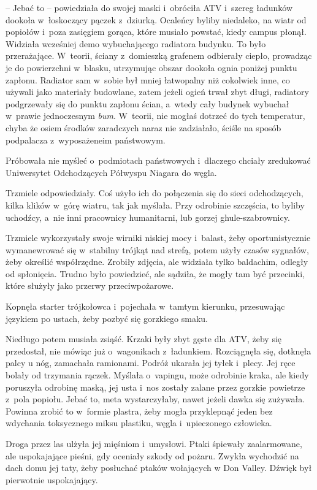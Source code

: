 \documentclass[oneside,polish,11pt,sfheadings]{mwbk}
\begin{document}
-- Jebać to -- powiedziała do swojej maski i~obróciła ATV i~szereg
ładunków dookoła w~łoskoczący pączek z~dziurką. Ocaleńcy byliby
niedaleko, na wiatr od popiołów i~poza zasięgiem gorąca, które musiało
powstać, kiedy campus płonął. Widziała wcześniej demo wybuchającego
radiatora budynku. To było przerażające. W~teorii, ściany z~domieszką
grafenem odbierały ciepło, prowadząc je do powierzchni w~blasku,
utrzymując obszar dookoła ognia poniżej punktu zapłonu. Radiator sam w~sobie był mniej łatwopalny niż cokolwiek inne, co używali jako materiały
budowlane, zatem jeżeli ogień trwał zbyt długi, radiatory podgrzewały
się do punktu zapłonu ścian, a~wtedy cały budynek wybuchał w~prawie
jednoczesnym \textit{bum}. W~teorii, nie mogłaś dotrzeć do tych
temperatur, chyba że osiem środków zaradczych naraz nie zadziałało,
ściśle na sposób podpalacza z~wyposażeneim państwowym.

Próbowała nie myśleć o~podmiotach państwowych i~dlaczego chciały
zredukować Uniwersytet Odchodzących Półwyspu Niagara do węgla.

Trzmiele odpowiedziały. Coś użyło ich do połączenia się do sieci
odchodzących, kilka klików w~górę wiatru, tak jak myślała. Przy
odrobinie szczęścia, to byliby uchodźcy, a~nie inni pracownicy
humanitarni, lub gorzej ghule-szabrownicy.

Trzmiele wykorzystały swoje wirniki niskiej mocy i~balast, żeby
oportunistycznie wymanewrować się w~stabilny trójkąt nad strefą, potem
użyły czasów sygnałów, żeby określić współrzędne. Zrobiły zdjęcia, ale
widziała tylko baldachim, odległy od spłonięcia. Trudno było powiedzieć,
ale sądziła, że mogły tam być przecinki, które służyły jako przerwy
przeciwpożarowe.

Kopnęła starter trójkołowca i~pojechała w~tamtym kierunku, przesuwając
językiem po ustach, żeby pozbyć się gorzkiego smaku.

Niedługo potem musiała zsiąść. Krzaki były zbyt gęste dla ATV, żeby się
przedostał, nie mówiąc już o~wagonikach z~ładunkiem. Rozciągnęła się,
dotknęła palcy u nóg, zamachała ramionami. Podróż ukarała jej tyłek i~plecy. Jej ręce bolały od trzymania rączek. Myślała o~vapingu, może
odrobinie kraka, ale kiedy poruszyła odrobinę maską, jej usta i~nos
zostały zalane przez gorzkie powietrze z~pola popiołu. Jebać to, meta
wystarczyłaby, nawet jeżeli dawka się zużywała. Powinna zrobić to w~formie plastra, żeby mogła przyklepnąć jeden bez wdychania toksycznego
miksu plastiku, węgla i~upieczonego człowieka.

Droga przez las ulżyła jej mięśniom i~umysłowi. Ptaki śpiewały
zaalarmowane, ale uspokajające pieśni, gdy oceniały szkody od pożaru.
Zwykła wychodzić na dach domu jej taty, żeby posłuchać ptaków wołających
w Don Valley. Dźwięk był pierwotnie uspokajający.
\end{document}
